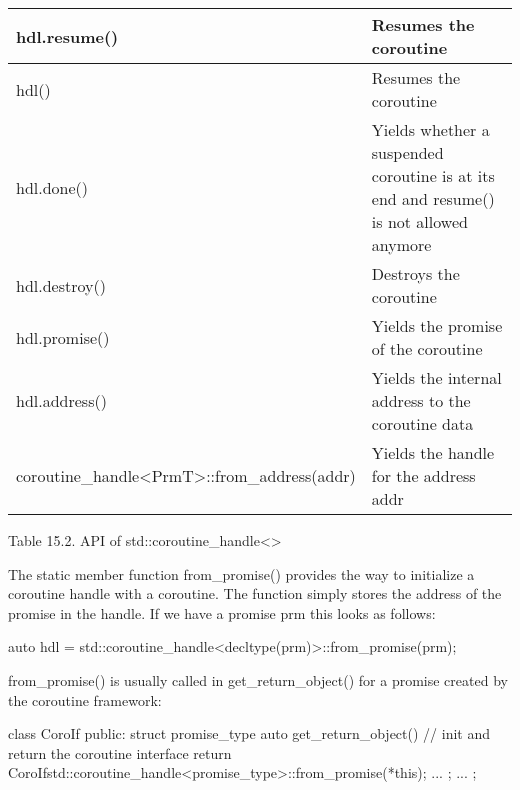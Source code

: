 \begin{longtable}[c]{|l|l|}
hdl.resume()                                                                           & Resumes the coroutine                                                                  \\ \hline
hdl()                                                                                  & Resumes the coroutine                                                                  \\ \hline
hdl.done()                                                                             & Yields whether a suspended coroutine is at its end and resume() is not allowed anymore \\ \hline
hdl.destroy()                                                                          & Destroys the coroutine                                                                 \\ \hline
hdl.promise()                                                                          & Yields the promise of the coroutine                                                    \\ \hline
hdl.address()                                                                          & Yields the internal address to the coroutine data                                      \\ \hline
coroutine\_handle\textless{}PrmT\textgreater{}::from\_address(addr)                    & Yields the handle for the address addr                                                 \\ \hline
\end{longtable}

\begin{center}
Table 15.2. API of std::coroutine\_handle<>
\end{center}

The static member function from\_promise() provides the way to initialize a coroutine handle with a coroutine. The function simply stores the address of the promise in the handle. If we have a promise prm this looks as follows:

\begin{cpp}
auto hdl = std::coroutine_handle<decltype(prm)>::from_promise(prm);
\end{cpp}

from\_promise() is usually called in get\_return\_object() for a promise created by the coroutine framework:

\begin{cpp}
class CoroIf {
	public:
	struct promise_type {
		auto get_return_object() { // init and return the coroutine interface
			return CoroIf{std::coroutine_handle<promise_type>::from_promise(*this)};
		}
		...
	};
...
};
\end{cpp}

